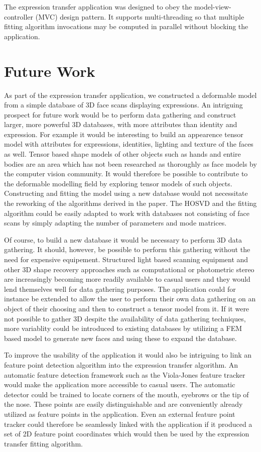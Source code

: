 \documentclass[11pt,a4paper,twoside]{report}
\begin{document}
The expression transfer application was designed to obey the model-view-controller (MVC) design
pattern. It supports multi-threading so that multiple fitting algorithm invocations may
be computed in parallel without blocking the application.

\section{Future Work}
As part of the expression transfer application, we constructed a deformable model from a simple database of 3D face scans displaying
expressions. An intriguing prospect for future work would be to perform data
gathering and construct larger, more powerful 3D databases,
with more attributes than identity and expression. For example it would be
interesting to build an appearence tensor model with attributes for expressions,
identities, lighting and texture of the faces as well. Tensor based shape models of other objects
such as hands and entire bodies are an area which has not been researched as
thoroughly as face models by the computer vision community. It would therefore
be possible to contribute to the deformable modelling field by exploring tensor models
of such objects. Constructing and fitting the model using a new database would not necessitate the reworking of the algorithms derived in the
paper. The HOSVD and the fitting algorithm could be easily adapted to work with
databases not consisting of face scans by simply adapting the number of
parameters and mode matrices. 

Of course, to build a new database it would be necessary to perform 3D data
gathering. It should, however, be possible to perform this gathering without the
need for expensive equipement. Structured light based scanning equipment and other 3D shape recovery approaches
such as computational or photometric stereo are increasingly becoming more readily
available to casual users and they would lend themselves well for data gathering
purposes. The application could for instance be extended to allow the user to
perform their own data gathering on an object of their choosing and then to
construct a tensor model from it. If it were not possible to gather 3D despite the availability of data gathering techniques,
more variablity could be introduced to existing databases by utilizing a FEM based
model to generate new faces and using these to expand the database.

To improve the usability of the application it would also be intriguing to link
an feature point detection algorithm into the expression transfer algorithm. An
automatic feature detection framework such as the Viola-Jones feature tracker
\cite{viola} would make the application more accessible to casual users. The automatic detector could be trained to locate corners of the
mouth, eyebrows or the tip of the nose. These points are easily distinguishable
and are conveniently already utilized as feature points in the application. Even an external feature point tracker could therefore be
seamlessly linked with the application if it produced a set of 2D feature
point coordinates which would then be used by the expression transfer fitting algorithm.
\end{document}
